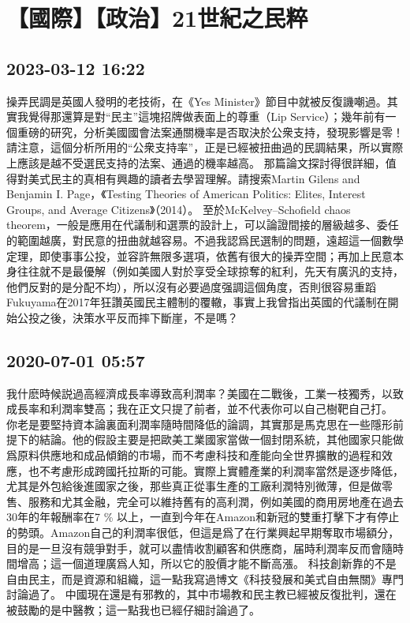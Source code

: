 \documentclass[twocolumn]{ctexart}
\begin{document}
\section*{【國際】【政治】21世紀之民粹}
\subsection*{2023-03-12 16:22}

操弄民調是英國人發明的老技術，在《Yes Minister》節目中就被反復譏嘲過。其實我覺得那還算是對“民主”這塊招牌做表面上的尊重（Lip Service）；幾年前有一個重磅的研究，分析美國國會法案通關機率是否取決於公衆支持，發現影響是零！請注意，這個分析所用的“公衆支持率”，正是已經被扭曲過的民調結果，所以實際上應該是越不受選民支持的法案、通過的機率越高。
那篇論文探討得很詳細，值得對美式民主的真相有興趣的讀者去學習理解。請搜索Martin Gilens and Benjamin I. Page，《Testing Theories of American Politics: Elites, Interest Groups, and Average Citizens》（2014）。
至於McKelvey–Schofield chaos theorem，一般是應用在代議制和選票的設計上，可以論證間接的層級越多、委任的範圍越廣，對民意的扭曲就越容易。不過我認爲民選制的問題，遠超這一個數學定理，即使事事公投，並容許無限多選項，依舊有很大的操弄空間；再加上民意本身往往就不是最優解（例如美國人對於享受全球掠奪的紅利，先天有廣汎的支持，他們反對的是分配不均），所以沒有必要過度强調這個角度，否則很容易重蹈Fukuyama在2017年狂讚英國民主體制的覆轍，事實上我曾指出英國的代議制在開始公投之後，決策水平反而摔下斷崖，不是嗎？
\subsection*{2020-07-01 05:57}

我什麽時候説過高經濟成長率導致高利潤率？美國在二戰後，工業一枝獨秀，以致成長率和利潤率雙高；我在正文只提了前者，並不代表你可以自己樹靶自己打。
你老是要堅持資本論裏面利潤率隨時間降低的論調，其實那是馬克思在一些隱形前提下的結論。他的假設主要是把歐美工業國家當做一個封閉系統，其他國家只能做爲原料供應地和成品傾銷的市場，而不考慮科技和產能向全世界擴散的過程和效應，也不考慮形成跨國托拉斯的可能。實際上實體產業的利潤率當然是逐步降低，尤其是外包給後進國家之後，那些真正從事生產的工廠利潤特別微薄，但是做零售、服務和尤其金融，完全可以維持舊有的高利潤，例如美國的商用房地產在過去30年的年報酬率在7 \% 以上，一直到今年在Amazon和新冠的雙重打擊下才有停止的勢頭。Amazon自己的利潤率很低，但這是爲了在行業興起早期奪取市場額分，目的是一旦沒有競爭對手，就可以盡情收割顧客和供應商，届時利潤率反而會隨時間增高；這一個道理廣爲人知，所以它的股價才能不斷高漲。
科技創新靠的不是自由民主，而是資源和組織，這一點我寫過博文《科技發展和美式自由無關》專門討論過了。
中國現在還是有邪教的，其中市場教和民主教已經被反復批判，還在被鼓勵的是中醫教；這一點我也已經仔細討論過了。
\end{document}
